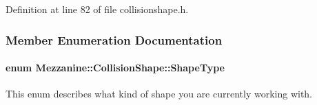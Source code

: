 Definition at line 82 of file collisionshape.h.



\subsubsection{Member Enumeration Documentation}
\hypertarget{classMezzanine_1_1CollisionShape_ad04186055565998879b64176d6dd100d}{
\paragraph[{ShapeType}]{\setlength{\rightskip}{0pt plus 5cm}enum {\bf Mezzanine::CollisionShape::ShapeType}}\hfill}
\label{classMezzanine_1_1CollisionShape_ad04186055565998879b64176d6dd100d}


This enum describes what kind of shape you are currently working with. 

